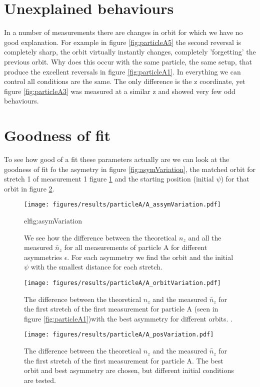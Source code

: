 \section{Unexplained behaviours}
In a number of measurements there are changes in orbit for which we have no good explanation. For example in figure \ref{fig:particleA5} the second reversal is completely sharp, the orbit virtually instantly changes, completely 'forgetting' the previous orbit. Why does this occur with the same particle, the same setup, that produce the excellent reversals in figure \ref{fig:particleA1}. In everything we can control all conditions are the same. The only difference is the z coordinate, yet figure \ref{fig:particleA3} was measured at a similar z and showed very few odd behaviours. 

\section{Goodness of fit}
 To see how good of a fit these parameters actually are we can look at the goodness of fit fo the asymetry in figure \ref{fig:asymVariation}, the matched orbit for stretch 1 of measurement 1 figure \ref{fig:orbitVariation} and the starting position (initial $\psi$) for that orbit in figure \ref{fig:initVariation}.  
 
 \begin{figure}[H]
 \begin{center}
 \texttt{[image: figures/results/particleA/A\_assymVariation.pdf]}
 \end{center}
 \caption{We see how the difference between the theoretical $n_z$ and all the measured  $\widetilde{n_z}$ for all measurements of particle A for different asymmetries $\epsilon$. For each asymmetry we find the orbit and the initial $\psi$ with the smallest distance for each stretch.}
 \lab{\tiny {\tiny {\tiny }}}el{fig:asymVariation}
 \end{figure}
 
 \begin{figure}[H]
 \begin{center}
 \texttt{[image: figures/results/particleA/A\_orbitVariation.pdf]}
 \end{center}
 \caption{The difference between the theoretical $n_z$ and the measured $\widetilde{n_z}$ for the first stretch of the first measurement for particle A (seen in figure \ref{fig:particleA1})with the best asymmetry for different orbits. .}
 \label{fig:orbitVariation}
 \end{figure}
 
 
 \begin{figure}[H]
 \begin{center}
 \texttt{[image: figures/results/particleA/A\_posVariation.pdf]}
 \end{center}
 \caption{The difference between the theoretical $n_z$ and the measured $\widetilde{n_z}$ for the first stretch of the first measurement for particle A. The best orbit and best asymmetry are chosen, but different initial conditions are tested. }
 \label{fig:initVariation}
 \end{figure}